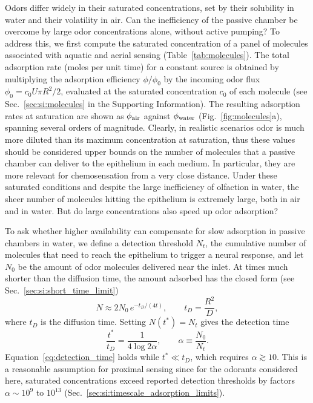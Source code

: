 \documentclass[%
 twocolumn,
 amsmath,amssymb,
 aps,prfluids,
 superscriptaddress,
]{revtex4-2}
\begin{document}
Odors differ widely in their saturated concentrations, set by their solubility in water and their volatility in air. Can the inefficiency of the passive chamber be overcome by large odor concentrations alone, without active pumping? To address this, we first compute the saturated concentration of a panel of molecules associated with aquatic and aerial sensing (Table~\ref{tab:molecules}). The total adsorption rate (moles per unit time) for a constant source is obtained by multiplying the adsorption efficiency $\phi/\phi_0$ by the incoming odor flux $\phi_0 = c_0 U \pi R^2/2$, evaluated at the saturated concentration $c_0$ of each molecule (see Sec.~\ref{sec:si:molecules} in the Supporting Information). The resulting adsorption rates at saturation are shown as $\phi_{\rm air}$ against $\phi_{\rm water}$ (Fig.~\ref{fig:molecules}a), spanning several orders of magnitude. Clearly, in realistic scenarios odor is much more diluted than its maximum concentration at saturation, thus these values should be considered upper bounds on the number of molecules that a passive chamber can deliver to the epithelium in each medium. In particular, they are more relevant for chemosensation from a very close distance.
Under these saturated conditions and despite the large inefficiency of olfaction in water, the sheer number of molecules hitting the epithelium is extremely large, both in air and in water. But do large concentrations also speed up odor adsorption?

To ask whether higher availability can compensate for slow adsorption in passive chambers in water, we define a detection threshold $N_t$, the cumulative number of molecules that need to reach the epithelium to trigger a neural response, 
and let $N_0$ be the amount of odor molecules delivered near the inlet. At times much shorter than the diffusion time, the amount adsorbed has the closed form (see Sec.~\ref{sec:si:short_time_limit})
\begin{equation}
    N \approx 2N_0\, e^{-t_D/(4t)}, \qquad t_D = \frac{R^2}{D},
    \label{eq:adsorption_short_time}
\end{equation}
where $t_D$ is the diffusion time. Setting $N(t^*) = N_t$ gives the detection time
\begin{equation}
    \frac{t^*}{t_D} = \frac{1}{4\log 2\alpha}, \qquad \alpha \equiv \frac{N_0}{N_t}.
    \label{eq:detection_time}
\end{equation}
Equation~\eqref{eq:detection_time} holds while $t^* \ll t_D$, which requires $\alpha \gtrsim 10$. This is a reasonable assumption for proximal sensing since for the odorants considered here, saturated concentrations exceed reported detection thresholds by factors $\alpha \sim 10^{9}$ to $10^{13}$ (Sec.~\ref{sec:si:timescale_adsorption_limits}).
\end{document}
